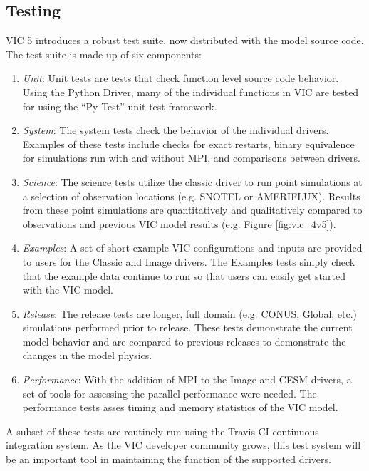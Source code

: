 \documentclass[gmd, manuscript]{copernicus}
\begin{document}
  \subsection{Testing}
    VIC 5 introduces a robust test suite, now distributed with the model source code.
    The test suite is made up of six components:

    \begin{enumerate}
      \item \textit{Unit}: Unit tests are tests that check function level source code behavior.
      Using the Python Driver, many of the individual functions in VIC are tested for using the ``Py-Test'' unit test framework.
      \item \textit{System}: The system tests check the behavior of the individual drivers.
      Examples of these tests include checks for exact restarts, binary equivalence for simulations run with and without MPI, and comparisons between drivers.
      \item \textit{Science}: The science tests utilize the classic driver to run point simulations at a selection of observation locations (e.g. SNOTEL or AMERIFLUX).
      Results from these point simulations are quantitatively and qualitatively compared to observations and previous VIC model results (e.g. Figure \ref{fig:vic_4v5}).
      \item \textit{Examples}: A set of short example VIC configurations and inputs are provided to users for the Classic and Image drivers.
      The Examples tests simply check that the example data continue to run so that users can easily get started with the VIC model.
      \item \textit{Release}: The release tests are longer, full domain (e.g. CONUS, Global, etc.) simulations performed prior to release.
      These tests demonstrate the current model behavior and are compared to previous releases to demonstrate the changes in the model physics.
      \item \textit{Performance}: With the addition of MPI to the Image and CESM drivers, a set of tools for assessing the parallel performance were needed.
      The performance tests asses timing and memory statistics of the VIC model.
    \end{enumerate}

    A subset of these tests are routinely run using the Travis CI continuous integration system.
    As the VIC developer community grows, this test system will be an important tool in maintaining the function of the supported drivers.
\end{document}
